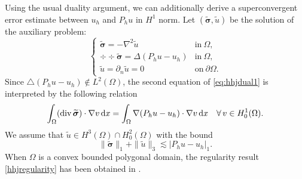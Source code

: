 Using the usual duality argument, we can additionally derive a superconvergent error estimate between $u_h$ and $P_hu$ in $H^1$ norm.
Let $(\widetilde{\boldsymbol{\sigma}},\widetilde{u})$ be the solution of the
auxiliary problem:
\begin{equation}\label{eq:hhjdual1}
\left\{
\begin{array}{ll}
\widetilde{\boldsymbol{\sigma}}=-\nabla^2\widetilde{u} & \text{in}\ \Omega, \\
\div\div\widetilde{\boldsymbol{\sigma}}
=\Delta(P_hu-u_h) & \text{in}\ \Omega, \\
\widetilde{u}=\partial_{n}\widetilde{u}=0 & \text{on}\ \partial
\Omega.
\end{array}
\right.
\end{equation}
Since $\triangle(P_hu-u_h)\not\in
L^2(\Omega)$,
the second equation of \eqref{eq:hhjdual1} is interpreted by the following
relation
\begin{equation}
\int_\Omega (\operatorname{div}\widetilde{\boldsymbol{\sigma}})\cdot
\nabla v\,{\rm d}x=\int_\Omega \nabla(P_hu-u_h)\cdot
\nabla v\,{\rm d}x\quad \forall\,v\in H^1_0(\Omega).
\label{hhjdual2}
\end{equation}
We assume that
$\widetilde{u}\in H^3(\Omega)\cap H_0^2(\Omega)$ with
the bound
\begin{equation}
\label{hhjregularity}
\|\widetilde{\boldsymbol{\sigma}}\|_{1}+\|\widetilde{u}\|_{3}\lesssim |P_hu-u_h|_{1}.
\end{equation}
When $\Omega$ is a convex bounded polygonal domain, the regularity result \eqref{hhjregularity} has been obtained in \cite{Dauge1988,Grisvard1992}.

